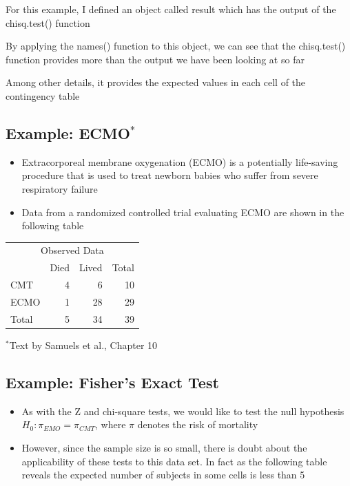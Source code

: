 \documentclass[
]{book}
\providecommand{\tightlist}{%
  \setlength{\itemsep}{0pt}\setlength{\parskip}{0pt}}
\begin{document}
For this example, I defined an object called result which has the output of the chisq.test() function

By applying the names() function to this object, we can see that the chisq.test() function provides more than the output we have been looking at so far

Among other details, it provides the expected values in each cell of the contingency table

\hypertarget{example-ecmo}{%
\subsection{\texorpdfstring{Example: ECMO\(^*\)}{Example: ECMO\^{}*}}\label{example-ecmo}}

\begin{itemize}
\tightlist
\item
  Extracorporeal membrane oxygenation (ECMO) is a potentially life-saving procedure that is used to treat newborn babies who suffer from severe respiratory failure
\item
  Data from a randomized controlled trial evaluating ECMO are shown in the following table
\end{itemize}

\begin{table}
\centering
\begin{tabular}{l|r|r|r}
\hline
\multicolumn{4}{c}{Observed Data} \\
\cline{1-4}
  & Died & Lived & Total\\
\hline
CMT & 4 & 6 & 10\\
\hline
ECMO & 1 & 28 & 29\\
\hline
Total & 5 & 34 & 39\\
\hline
\end{tabular}
\end{table}

\(^*\)Text by Samuels et al., Chapter 10

\hypertarget{example-fishers-exact-test}{%
\subsection{Example: Fisher's Exact Test}\label{example-fishers-exact-test}}

\begin{itemize}
\tightlist
\item
  As with the Z and chi-square tests, we would like to test the null hypothesis \(H_0:\pi_{EMO}=\pi_{CMT}\), where \(\pi\) denotes the risk of mortality
\item
  However, since the sample size is so small, there is doubt about the applicability of these tests to this data set. In fact as the following table reveals the expected number of subjects in some cells is less than 5
\end{itemize}
\end{document}
